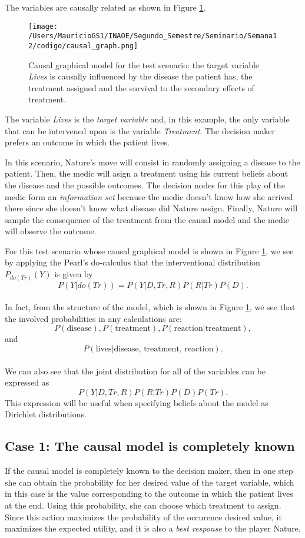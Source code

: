\documentclass[11pt]{article}
\theoremstyle{plain}
\begin{document}
The variables are causally related as shown in Figure \ref{causal_model}.

\begin{figure}[ht]
\vskip 0.2in
\begin{center}
\centerline{\texttt{[image: /Users/MauricioGS1/INAOE/Segundo\_Semestre/Seminario/Semana12/codigo/causal\_graph.png]}}
\caption{Causal graphical model for the test scenario: the target variable \textit{Lives} is causally influenced by the disease the patient has, the treatment assigned and the survival to the secondary effects of treatment.}
\label{causal_model}
\end{center}
\vskip -0.2in
\end{figure}

The variable \textit{Lives} is the \textit{target variable} and, in this example, the only variable that can be intervened upon is the variable \textit{Treatment}. The decision maker prefers an outcome in which the patient lives.

In this scenario, Nature's move will consist in randomly assigning a disease to the patient. Then, the medic will asign a treatment using his current beliefs about the disease and the possible outcomes. The decision nodes for this play of the medic form an \textit{information set} because the medic doesn't know how she arrived there since she doesn't know what disease did Nature assign. Finally, Nature will sample the consequence of the treatment from the causal model and the medic will observe the outcome.

For this test scenario whose causal graphical model is shown in Figure \ref{causal_model}, we see  by applying the Pearl's do-calculus that the interventional distribution $P_{do(Tr)}(Y)$ is given by
\[ P(Y | do(Tr))=P(Y | D, Tr, R)P(R | Tr) P(D). \]
\\
In fact, from the structure of the model, which is shown in Figure \ref{causal_model}, we see that the involved probabilities in any calculations are:
\[ P(\textrm{disease}), P(\textrm{treatment}), P(\textrm{reaction} | \textrm{treatment}), \]
and
\[P(\textrm{lives} | \textrm{disease, treatment, reaction}). \]
\\
We can also see that the joint distribution for all of the variables can be expressed as
\[ P(Y | D, Tr, R)P(R | Tr) P(D)P(Tr). \]
This expression will be useful when specifying beliefs about the model as Dirichlet distributions.

\subsection{Case 1: The causal model is completely known}
If the causal model is completely known to the decision maker, then in one step she can obtain the probability for her desired value of the target variable, which in this case is the value corresponding to the outcome in which the patient lives at the end. Using this probability, she can choose which treatment to assign. Since this action maximizes the probability of the occurence desired value, it maximizes the expected utility, and it is also a \textit{best response} to the player Nature.
\end{document}
